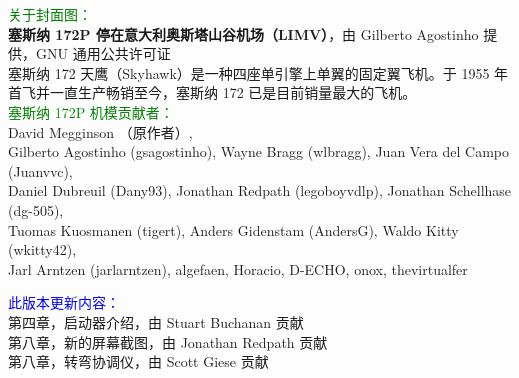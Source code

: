 


\ifchinese
\date{FlightGear 手册\\
\today\\
适用于 \FlightGear{} \version{} 版\\
\small 佟辉（中文翻译）}
\fi

\maketitle
\noindent \small \textcolor{green}{关于封面图：}\\
\textbf{塞斯纳 172P 停在意大利奥斯塔山谷机场（LIMV）}，由 Gilberto Agostinho 提供，GNU 通用公共许可证\\

\noindent 塞斯纳 172 天鹰（Skyhawk）是一种四座单引擎上单翼的固定翼飞机。于 1955 年首飞并一直生产畅销至今，塞斯纳 172 已是目前销量最大的飞机。\\

\noindent \textcolor{green}{塞斯纳 172P 机模贡献者：}\\
David Megginson （原作者）,\\
Gilberto Agostinho (gsagostinho), Wayne Bragg (wlbragg), Juan Vera del Campo (Juanvvc),\\
Daniel Dubreuil (Dany93), Jonathan Redpath (legoboyvdlp), Jonathan Schellhase (dg-505),\\
Tuomas Kuosmanen (tigert), Anders Gidenstam (AndersG), Waldo Kitty (wkitty42),\\
Jarl Arntzen (jarlarntzen), algefaen, Horacio, D-ECHO, onox, thevirtualfer
\vskip 5cm

\noindent \textcolor{blue}{此版本更新内容：}\\
第四章，启动器介绍，由 Stuart Buchanan 贡献\\
第八章，新的屏幕截图，由 Jonathan Redpath 贡献\\
第八章，转弯协调仪，由 Scott Giese 贡献\\


\tableofcontents

